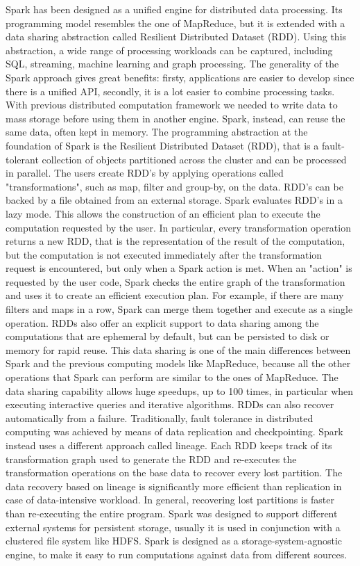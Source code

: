 Spark has been designed as a unified engine for distributed data processing. Its programming model resembles the one of MapReduce, but it is extended with a data sharing abstraction called Resilient Distributed Dataset (RDD). Using this abstraction, a wide range of processing workloads can be captured, including SQL, streaming, machine learning and graph processing. The generality of the Spark approach gives great benefits: firsty, applications are easier to develop since there is a unified API,  secondly, it is a lot easier to combine processing tasks. With previous distributed computation framework we needed to write data to mass storage before using them in another engine. Spark, instead, can reuse the same data, often kept in memory.
The programming abstraction at the foundation of Spark is the Resilient Distributed Dataset (RDD), that is a fault-tolerant collection of objects partitioned across the cluster and can be processed in parallel. The users create RDD's by applying operations called "transformations", such as map, filter and group-by, on the data. RDD's can be
backed by a file obtained from an external storage. Spark evaluates RDD's in a lazy mode. This allows the construction of an efficient plan to execute the computation requested by the user. In particular, every transformation operation returns a new RDD, that is the representation of the result of the computation, but the computation is not executed immediately after the transformation request is encountered, but only when a Spark action is met. When an "action" is requested by the user code, Spark checks the entire graph of the transformation and uses it to create an efficient execution plan. For example, if there are many filters and maps in a row, Spark can merge them together and execute as a single operation.
RDDs also offer an explicit support to data sharing among the computations that are ephemeral by default, but can be persisted to disk or memory for rapid reuse. This data sharing is one of the main differences between Spark and the previous computing models
like MapReduce, because all the other operations that Spark can perform are similar to the ones of MapReduce. The data sharing capability allows huge speedups, up to 100 times, in particular when executing interactive queries and iterative algorithms.
RDDs can also recover automatically from a failure. Traditionally, fault tolerance in distributed computing was achieved by means of data replication and checkpointing. Spark instead uses a different approach called lineage. Each RDD keeps track of its transformation graph used to generate the RDD and re-executes the transformation operations on the base data to recover every lost partition. The data recovery based on lineage is significantly more efficient than replication in case of data-intensive workload. In general, recovering lost partitions is faster than re-executing the entire program. Spark was designed to support different external systems for persistent storage, usually it is used in conjunction with a clustered file system like HDFS. Spark is designed as a storage-system-agnostic engine, to make it easy to run computations against data from different sources.
